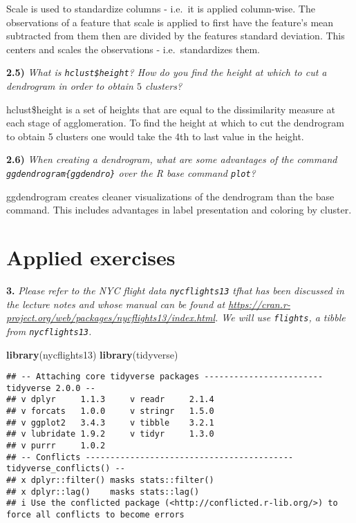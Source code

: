 \documentclass[
]{article}
\newenvironment{Shaded}{\begin{snugshade}}{\end{snugshade}}
\newcommand{\FunctionTok}[1]{\textcolor[rgb]{0.13,0.29,0.53}{\textbf{#1}}}
\newcommand{\NormalTok}[1]{#1}
\begin{document}
Scale is used to standardize columns - i.e.~it is applied column-wise.
The observations of a feature that scale is applied to first have the
feature's mean subtracted from them then are divided by the features
standard deviation. This centers and scales the observations -
i.e.~standardizes them.

\textbf{2.5)} \emph{What is \texttt{hclust\$height}? How do you find the
height at which to cut a dendrogram in order to obtain \(5\) clusters?}

hclust\$height is a set of heights that are equal to the dissimilarity
measure at each stage of agglomeration. To find the height at which to
cut the dendrogram to obtain 5 clusters one would take the 4th to last
value in the height.

\textbf{2.6)} \emph{When creating a dendrogram, what are some advantages
of the command \texttt{ggdendrogram\{ggdendro\}} over the R base command
\texttt{plot}?}

ggdendrogram creates cleaner visualizations of the dendrogram than the
base command. This includes advantages in label presentation and
coloring by cluster.

\hypertarget{applied-exercises}{%
\section{Applied exercises}\label{applied-exercises}}

\noindent \textbf{3.} \emph{Please refer to the NYC flight data
\texttt{nycflights13} tfhat has been discussed in the lecture notes and
whose manual can be found at
\url{https://cran.r-project.org/web/packages/nycflights13/index.html}.
We will use \texttt{flights}, a tibble from \texttt{nycflights13}.}

\begin{Shaded}
\begin{Highlighting}[]
\FunctionTok{library}\NormalTok{(nycflights13)}
\FunctionTok{library}\NormalTok{(tidyverse)}
\end{Highlighting}
\end{Shaded}

\begin{verbatim}
## -- Attaching core tidyverse packages ------------------------ tidyverse 2.0.0 --
## v dplyr     1.1.3     v readr     2.1.4
## v forcats   1.0.0     v stringr   1.5.0
## v ggplot2   3.4.3     v tibble    3.2.1
## v lubridate 1.9.2     v tidyr     1.3.0
## v purrr     1.0.2     
## -- Conflicts ------------------------------------------ tidyverse_conflicts() --
## x dplyr::filter() masks stats::filter()
## x dplyr::lag()    masks stats::lag()
## i Use the conflicted package (<http://conflicted.r-lib.org/>) to force all conflicts to become errors
\end{verbatim}
\end{document}
